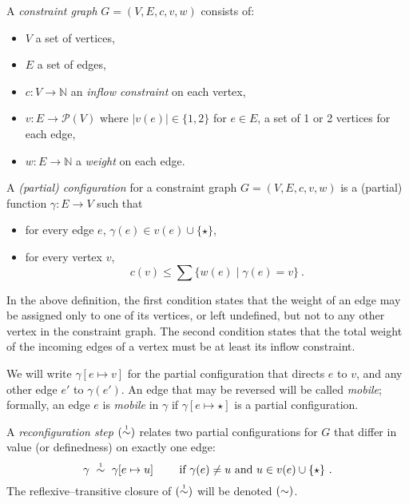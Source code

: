 \documentclass{lmcs}
\begin{document}
\begin{definition} 
A \emph{constraint graph} $G=(V,E,c,v,w)$ consists of:
\begin{itemize}
	\item $V$ a set of vertices,
	\item $E$ a set of edges,
	\item $c\colon V\to\mathbb N$ an \emph{inflow constraint} on each vertex,
	\item $v\colon E\to\mathcal P(V)$ where $|v(e)|\in\{1,2\}$ for $e\in E$, a set of 1 or 2 vertices for each edge,
 	\item $w\colon E\to\mathbb N$ a \emph{weight} on each edge.
\end{itemize}
\end{definition}

\begin{definition}
A \emph{(partial) configuration} for a constraint graph $G=(V,E,c,v,w)$ is a (partial) function $\gamma\colon E\to V$ such that
\begin{itemize}
	\item
for every edge $e$, $\gamma(e)\in v(e)\cup\{\star\}$,
	\item
for every vertex $v$,
\[
	c(v) \leq \sum\{w(e)\mid\gamma(e)=v\}~.
\]
\end{itemize} 
\end{definition}

In the above definition, the first condition states that the weight of an edge may be assigned only to one of its vertices, or left undefined, but not to any other vertex in the constraint graph. The second condition states that the total weight of the incoming edges of a vertex must be at least its inflow constraint.

We will write $\gamma[e\mapsto v]$ for the partial configuration that directs $e$ to $v$, and any other edge $e'$ to $\gamma(e')$. An edge that may be reversed will be called \emph{mobile}; formally, an edge $e$ is \emph{mobile} in $\gamma$ if $\gamma[e\mapsto\star]$ is a partial configuration.

\begin{definition}
A \emph{reconfiguration step} $(\perm*)$ relates two partial configurations for $G$ that differ in value (or definedness) on exactly one edge:
\[
	\gamma~\perm*~\gamma[e\mapsto u]\qquad\text{ if }\gamma(e)\neq u\text{ and }u\in v(e)\cup\{\star\}~.
\]
The reflexive--transitive closure of $(\perm*)$ will be denoted $(\perm)$.
\end{definition}
\end{document}
